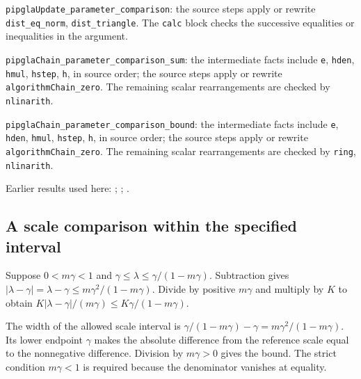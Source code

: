 \documentclass[11pt,a4paper]{report}
\begin{document}
\begin{leanbox}
\texttt{pipgla\allowbreak{}Update\_\allowbreak{}parameter\_\allowbreak{}comparison}: the source steps apply or rewrite \texttt{dist\_\allowbreak{}eq\_\allowbreak{}norm}, \texttt{dist\_\allowbreak{}triangle}. The \texttt{calc} block checks the successive equalities or inequalities in the argument.



\texttt{pipgla\allowbreak{}Chain\_\allowbreak{}parameter\_\allowbreak{}comparison\_\allowbreak{}sum}: the intermediate facts include \texttt{e}, \texttt{hden}, \texttt{hmul}, \texttt{hstep}, \texttt{h}, in source order; the source steps apply or rewrite \texttt{algorithm\allowbreak{}Chain\_\allowbreak{}zero}. The remaining scalar rearrangements are checked by \texttt{nlinarith}.



\texttt{pipgla\allowbreak{}Chain\_\allowbreak{}parameter\_\allowbreak{}comparison\_\allowbreak{}bound}: the intermediate facts include \texttt{e}, \texttt{hden}, \texttt{hmul}, \texttt{hstep}, \texttt{h}, in source order; the source steps apply or rewrite \texttt{algorithm\allowbreak{}Chain\_\allowbreak{}zero}. The remaining scalar rearrangements are checked by \texttt{ring}, \texttt{nlinarith}.
\end{leanbox}


Earlier results used here: \cite[Section~3.15.1]{LangevinLean2026ULASC}; \cite[Section~3.15.3]{LangevinLean2026ULASC}; \cite[Section~3.1.1]{LangevinLean2026IPLA}.
\subsection{\texorpdfstring{A scale comparison within the specified interval}{A scale comparison within the specified interval}}
\label{report-step-ProximalLangevin-ProxParameter-lean-5}


Suppose \(0<m\gamma<1\) and \(\gamma\le\lambda\le\gamma/(1-m\gamma)\). Subtraction gives \(|\lambda-\gamma|=\lambda-\gamma\le m\gamma^2/(1-m\gamma)\). Divide by positive \(m\gamma\) and multiply by \(K\) to obtain \(K|\lambda-\gamma|/(m\gamma)\le K\gamma/(1-m\gamma)\).



The width of the allowed scale interval is \(\gamma/(1-m\gamma)-\gamma=m\gamma^2/(1-m\gamma)\). Its lower endpoint \(\gamma\) makes the absolute difference from the reference scale equal to the nonnegative difference. Division by \(m\gamma>0\) gives the bound. The strict condition \(m\gamma<1\) is required because the denominator vanishes at equality.
\end{document}
